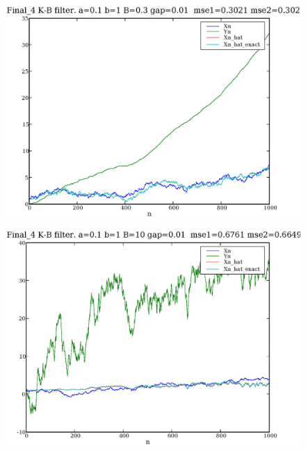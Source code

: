 \documentclass[a4paper,10pt]{article}
\begin{document}
\begin{figure}
\includegraphics[width=1\textwidth]{Final_4_Xn_Yn_Xn_hat_a_0.1_b_1_B_0.3_gap_0.01.eps}
\caption{}\label{f10}
\end{figure}

\begin{figure}
\includegraphics[width=1\textwidth]{Final_4_Xn_Yn_Xn_hat_a_0.1_b_1_B_10_gap_0.01.eps}
\caption{}\label{f11}
\end{figure}
\end{document}
